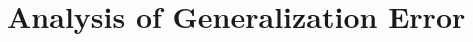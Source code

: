 \documentclass[a4paper,11pt]{article}
\begin{document}
\section{Analysis of Generalization Error}
\end{document}
